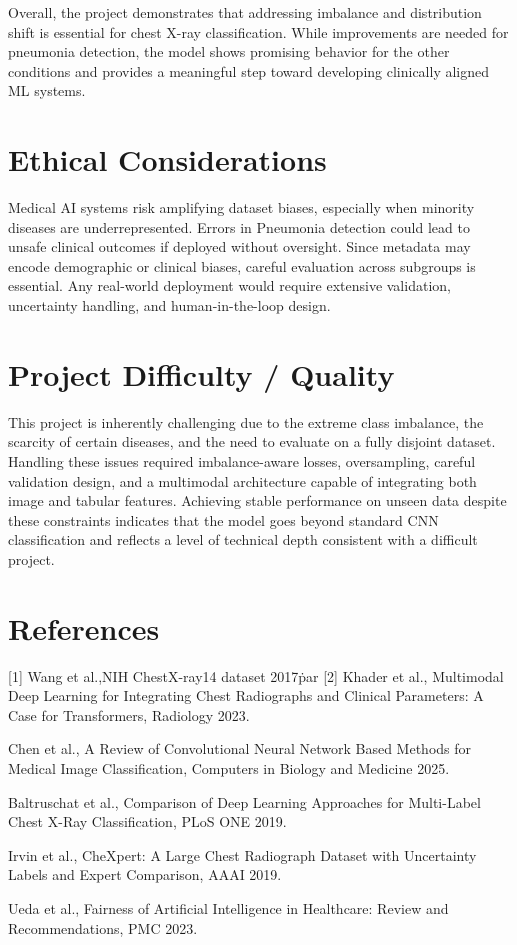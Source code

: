 \documentclass[final]{article}
\begin{document}
Overall, the project demonstrates that addressing imbalance and distribution shift is essential for chest X-ray classification. While improvements are needed for pneumonia detection, the model shows promising behavior for the other conditions and provides a meaningful step toward developing clinically aligned ML systems.


\section{Ethical Considerations}
Medical AI systems risk amplifying dataset biases, especially when minority diseases are underrepresented. Errors in Pneumonia detection could lead to unsafe clinical outcomes if deployed without oversight. Since metadata may encode demographic or clinical biases, careful evaluation across subgroups is essential. Any real-world deployment would require extensive validation, uncertainty handling, and human-in-the-loop design.

\section{Project Difficulty / Quality}
This project is inherently challenging due to the extreme class imbalance, the scarcity of certain diseases, and the need to evaluate on a fully disjoint dataset. Handling these issues required imbalance-aware losses, oversampling, careful validation design, and a multimodal architecture capable of integrating both image and tabular features. Achieving stable performance on unseen data despite these constraints indicates that the model goes beyond standard CNN classification and reflects a level of technical depth consistent with a difficult project.


\newpage
\section*{References}
[1] Wang et al.,NIH ChestX-ray14 dataset 2017\.par
[2] Khader et al., Multimodal Deep Learning for Integrating Chest Radiographs and Clinical Parameters: A Case for Transformers, Radiology 2023.\par
[3] Chen et al., A Review of Convolutional Neural Network Based Methods for Medical Image Classification, Computers in Biology and Medicine 2025.\par
[4] Baltruschat et al., Comparison of Deep Learning Approaches for Multi-Label Chest X-Ray Classification, PLoS ONE 2019.\par
[5] Irvin et al., CheXpert: A Large Chest Radiograph Dataset with Uncertainty Labels and Expert Comparison, AAAI 2019.\par
[6] Ueda et al., Fairness of Artificial Intelligence in Healthcare: Review and Recommendations, PMC 2023.\par
\end{document}
